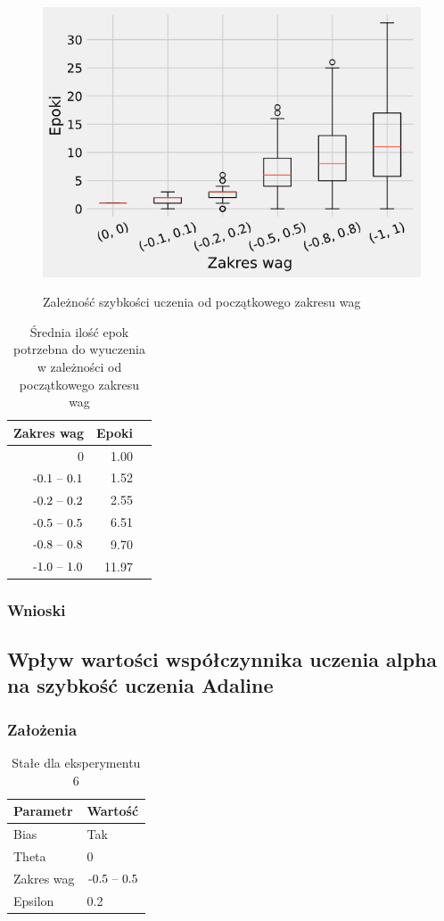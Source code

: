 \documentclass{article}
\begin{document}
\begin{figure}[h]
	\centering
	\caption{Zależność szybkości uczenia od początkowego zakresu wag}
	\includegraphics[width=.5\textwidth]{ada_w.png}
	\label{fig:res5}
\end{figure}

\begin{table}[h]
	\caption{Średnia ilość epok potrzebna do wyuczenia w zależności od początkowego zakresu wag}
	\label{tabela-res-5}
	\centering
	\begin{tabular}{rrr}
		\toprule
		Zakres wag        & Epoki \\
		\midrule
		0                 & 1.00  \\
		\($-0.1 -- 0.1$\) & 1.52  \\
		\($-0.2 -- 0.2$\) & 2.55  \\
		\($-0.5 -- 0.5$\) & 6.51  \\
		\($-0.8 -- 0.8$\) & 9.70  \\
		\($-1.0 -- 1.0$\) & 11.97 \\
		\bottomrule
	\end{tabular}
\end{table}

\subsubsection*{Wnioski}

\newpage
\subsection{Wpływ wartości współczynnika uczenia alpha na szybkość uczenia Adaline}
\subsubsection*{Założenia}

\begin{table}[h]
	\caption{Stałe dla eksperymentu 6}
	\label{tabela-const-6}
	\centering
	\begin{tabular}{ll}
		\toprule
		Parametr   & Wartość         \\
		\midrule
		Bias       & Tak               \\
		Theta      & 0                 \\
		Zakres wag & \($-0.5 -- 0.5$\) \\
		Epsilon    & 0.2               \\
		\bottomrule
	\end{tabular}
\end{table}
\end{document}
